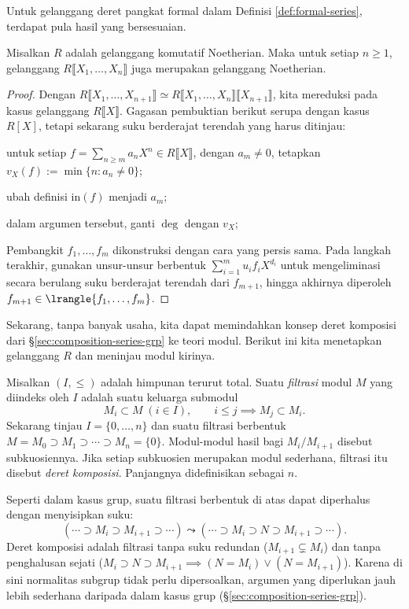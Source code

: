 Untuk gelanggang deret pangkat formal dalam Definisi \ref{def:formal-series}, terdapat pula hasil yang bersesuaian.
\begin{theorem}
	Misalkan $R$ adalah gelanggang komutatif Noetherian. Maka untuk setiap $n \geq 1$, gelanggang $R\llbracket X_1, \ldots, X_n \rrbracket$ juga merupakan gelanggang Noetherian.
\end{theorem}
\begin{proof}
	Dengan $R \llbracket X_1, \ldots, X_{n+1}\rrbracket \simeq R \llbracket X_1, \ldots, X_n \rrbracket \llbracket X_{n+1}\rrbracket$, kita mereduksi pada kasus gelanggang $R \llbracket X \rrbracket$. Gagasan pembuktian berikut serupa dengan kasus $R[X]$, tetapi sekarang suku berderajat terendah yang harus ditinjau:
	\begin{compactitem}
		\item untuk setiap $f = \sum_{n \geq m} a_n X^n \in R\llbracket X \rrbracket$, dengan $a_m \neq 0$, tetapkan $v_X(f) := \min\{n: a_n \neq 0\}$;
		\item ubah definisi $\text{in}(f)$ menjadi $a_m$;
		\item dalam argumen tersebut, ganti $\deg$ dengan $v_X$;
	\end{compactitem}
	Pembangkit $f_1, \ldots, f_m$ dikonstruksi dengan cara yang persis sama. Pada langkah terakhir, gunakan unsur-unsur berbentuk $\sum_{i=1}^m u_i f_i X^{d_i}$ untuk mengeliminasi secara berulang suku berderajat terendah dari $f_{m+1}$, hingga akhirnya diperoleh $f_{m+1} \in \lrangle{f_1, \ldots, f_m}$.
\end{proof}

Sekarang, tanpa banyak usaha, kita dapat memindahkan konsep deret komposisi dari \S\ref{sec:composition-series-grp} ke teori modul. Berikut ini kita menetapkan gelanggang $R$ dan meninjau modul kirinya.
\begin{definition}
	Misalkan $(I, \leq)$ adalah himpunan terurut total. Suatu \emph{filtrasi} modul $M$ yang diindeks oleh $I$ adalah suatu keluarga submodul
	\[ M_i \subset M\; (i \in I), \qquad i \leq j \implies M_j \subset M_i. \]
	Sekarang tinjau $I = \{0, \ldots, n\}$ dan suatu filtrasi berbentuk $M = M_0 \supset M_1 \supset \cdots \supset M_n = \{0\}$. Modul-modul hasil bagi $M_i/M_{i+1}$ disebut subkuosiennya. Jika setiap subkuosien merupakan modul sederhana, filtrasi itu disebut \emph{deret komposisi}. Panjangnya didefinisikan sebagai $n$.
\end{definition}
Seperti dalam kasus grup, suatu filtrasi berbentuk di atas dapat diperhalus dengan menyisipkan suku:
\[ (\cdots \supset M_i \supset M_{i+1} \supset \cdots) \leadsto (\cdots \supset M_i \supset N \supset M_{i+1} \supset \cdots). \]
Deret komposisi adalah filtrasi tanpa suku redundan ($M_{i+1} \subsetneq M_i$) dan tanpa penghalusan sejati ($M_i \supset N \supset M_{i+1} \implies (N=M_i) \vee (N=M_{i+1})$). Karena di sini normalitas subgrup tidak perlu dipersoalkan, argumen yang diperlukan jauh lebih sederhana daripada dalam kasus grup (\S\ref{sec:composition-series-grp}).

